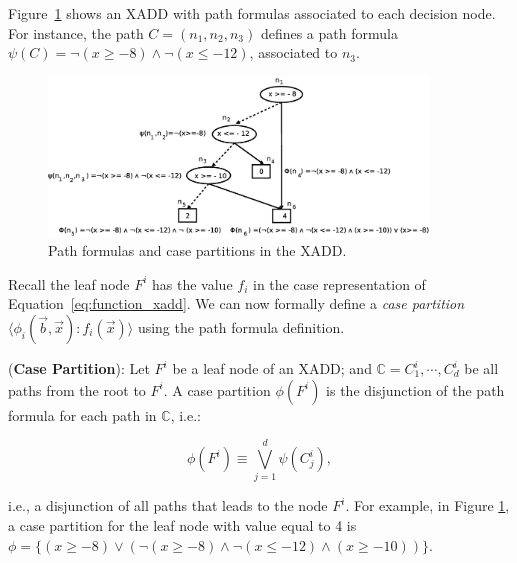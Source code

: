 \documentclass[twoside,11pt]{article}
\newenvironment{mydef}[1][Definition]{\begin{trivlist}
\item[\hskip \labelsep {\bfseries #1}]}{\end{trivlist}}
\begin{document}
Figure~\ref{fig:path} shows an XADD with path formulas associated to each  decision node. For instance, the path $C=(n_1, n_2, n_3)$ defines a path formula $\psi(C)=\neg (x \geq -8) \wedge \neg (x \leq -12)$, associated to $n_3$.

\begin{figure}[t!]
\centering
\includegraphics[width=0.9\textwidth]{FiguresSource/path.eps}
\vspace{-2mm}
\caption{%
Path formulas and case partitions in the XADD.}
\label{fig:path}
\end{figure}
Recall the leaf node $F^i$ has the value $f_i$ in the case representation of Equation~\ref{eq:function_xadd}. We can now formally define a \emph{case partition} 
$\langle \phi_i(\vec{b},\vec{x}): f_i(\vec{x})\rangle$ using the path formula definition. 

\begin{mydef}(\textbf{Case Partition}): Let $F^i$ be a leaf node of an XADD; and $\mathbb{C}= {C_1^i, \cdots, C_d^i} $ be all paths from the root to $F^i$. A case partition $\phi(F^i)$ is the disjunction of the path formula for each path in $\mathbb{C}$, i.e.: 

\begin{equation}
\phi(F^i) \equiv \bigvee_{j=1}^{d} \psi(C_j^i), \label{eq:casePartition}
\end{equation} 
\end{mydef}
i.e., a disjunction of all paths that leads to the node $F^i$.
For example,  in Figure \ref{fig:path}, a case partition for the leaf node with value equal to 4 is $\phi=\{(x \geq -8) \vee (\neg (x \geq -8) \wedge \neg(x \leq -12) \wedge ( x\geq -10))\}$.
\end{document}
